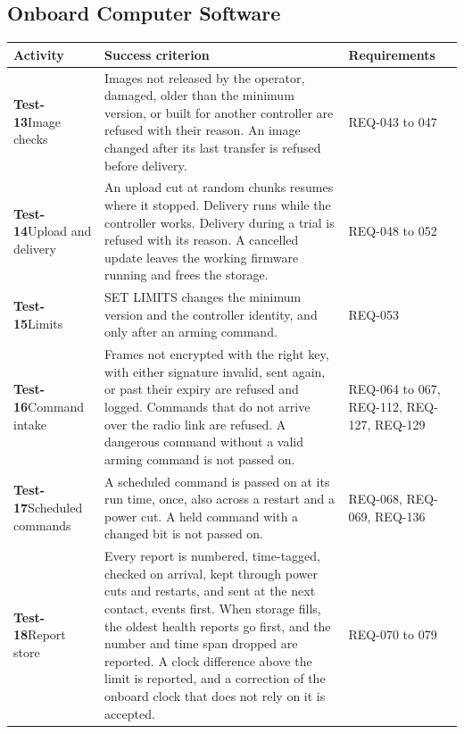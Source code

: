\documentclass[11pt,a4paper]{article}
\begin{document}
\subsection{Onboard Computer Software}
{\footnotesize
\begin{xltabular}{\textwidth}{@{}>{\raggedright\arraybackslash}p{3.0cm}>{\raggedright\arraybackslash}X>{\raggedright\arraybackslash}p{2.4cm}@{}}
\toprule
Activity & Success criterion & Requirements \\
\midrule
\endhead
\textbf{Test-13}\newline Image checks & Images not released by the operator, damaged, older than the minimum version, or built for another controller are refused with their reason. An image changed after its last transfer is refused before delivery. & REQ-043 to 047 \\
\textbf{Test-14}\newline Upload and delivery & An upload cut at random chunks resumes where it stopped. Delivery runs while the controller works. Delivery during a trial is refused with its reason. A cancelled update leaves the working firmware running and frees the storage. & REQ-048 to 052 \\
\textbf{Test-15}\newline Limits & SET LIMITS changes the minimum version and the controller identity, and only after an arming command. & REQ-053 \\
\textbf{Test-16}\newline Command intake & Frames not encrypted with the right key, with either signature invalid, sent again, or past their expiry are refused and logged. Commands that do not arrive over the radio link are refused. A dangerous command without a valid arming command is not passed on. & REQ-064 to 067, REQ-112, REQ-127, REQ-129 \\
\textbf{Test-17}\newline Scheduled commands & A scheduled command is passed on at its run time, once, also across a restart and a power cut. A held command with a changed bit is not passed on. & REQ-068, REQ-069, REQ-136 \\
\textbf{Test-18}\newline Report store & Every report is numbered, time-tagged, checked on arrival, kept through power cuts and restarts, and sent at the next contact, events first. When storage fills, the oldest health reports go first, and the number and time span dropped are reported. A clock difference above the limit is reported, and a correction of the onboard clock that does not rely on it is accepted. & REQ-070 to 079 \\

\end{xltabular}}
\end{document}
